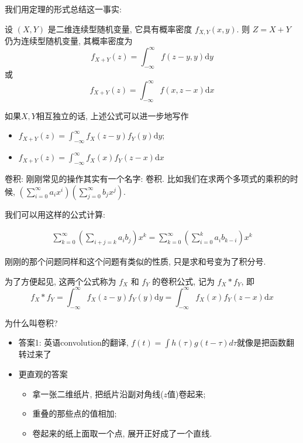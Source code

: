 我们用定理的形式总结这一事实: 
\begin{theorem}
    设 $(X, Y)$ 是二维连续型随机变量, 它具有概率密度 $f_{X,Y}(x, y)$. 则 $Z=X+Y$ 仍为连续型随机变量, 其概率密度为
    $$f_{X+Y}(z)=\int_{-\infty}^{\infty} f(z-y, y) \mathrm{d} y$$
    或
    $$
f_{X+Y}(z)=\int_{-\infty}^{\infty} f(x, z-x) \mathrm{d} x
$$
\end{theorem}

如果$X,Y$相互独立的话, 上述公式可以进一步地写作
\begin{itemize}
    \item $f_{X+Y}(z)=\int_{-\infty}^{\infty} f_X(z-y) f_Y(y) \mathrm{d} y$;
    \item $f_{X+Y}(z)=\int_{-\infty}^{\infty} f_X(x) f_Y(z-x) \mathrm{d} x$
\end{itemize}

\begin{asidebox}
    卷积: 刚刚常见的操作其实有一个名字: 卷积. 比如我们在求两个多项式的乘积的时候, $(\sum_{i=0}^{\infty} a_i x^i)(\sum_{j=0}^{\infty} b_j x^j).$

    我们可以用这样的公式计算: 

    $$
    \begin{aligned}
        \sum_{k=0}^{\infty}\left(\sum_{i+j=k} a_i b_j\right) x^k
        =\sum_{k=0}^{\infty}\left(\sum_{i=0}^k a_i b_{k-i}\right) x^k
    \end{aligned}
    $$

    刚刚的那个问题同样和这个问题有类似的性质, 只是求和号变为了积分号. 

\end{asidebox}

为了方便起见, 这两个公式称为 $f_X$ 和 $f_Y$ 的卷积公式, 记为 $f_X * f_Y$, 即
$$
f_X * f_Y=\int_{-\infty}^{\infty} f_X(z-y) f_Y(y) \mathrm{d} y=\int_{-\infty}^{\infty} f_X(x) f_Y(z-x) \mathrm{d} x
$$

\begin{asidebox}
    为什么叫卷积? 
    \begin{itemize}
        \item 答案1: 英语convolution的翻译, $f(t)=\int h(\tau) g(t-\tau) d \tau$就像是把函数翻转过来了
        \item 更直观的答案
        \begin{itemize}
            \item 拿一张二维纸片, 把纸片沿副对角线($z$值)卷起来;
            \item 重叠的那些点的值相加;
            \item 卷起来的纸上面取一个点, 展开正好成了一个直线. 
        \end{itemize}
    \end{itemize}
\end{asidebox}


